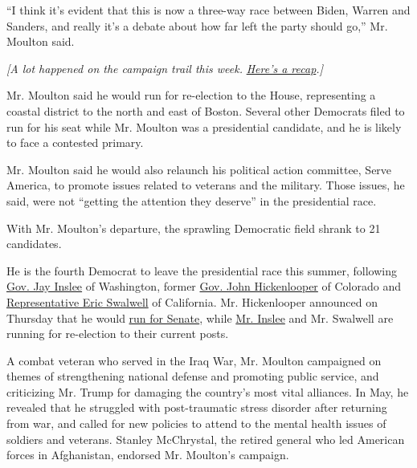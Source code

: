 ``I think it's evident that this is now a three-way race between Biden,
Warren and Sanders, and really it's a debate about how far left the
party should go,'' Mr. Moulton said.

\emph{{[}A lot happened on the campaign trail this week.}
\href{https://www.nytimes3xbfgragh.onion/2019/08/24/us/politics/2020-democratic-presidential-candidates.html}{\emph{Here's
a recap}}\emph{.{]}}

Mr. Moulton said he would run for re-election to the House, representing
a coastal district to the north and east of Boston. Several other
Democrats filed to run for his seat while Mr. Moulton was a presidential
candidate, and he is likely to face a contested primary.

Mr. Moulton said he would also relaunch his political action committee,
Serve America, to promote issues related to veterans and the military.
Those issues, he said, were not ``getting the attention they deserve''
in the presidential race.

With Mr. Moulton's departure, the sprawling Democratic field shrank to
21 candidates.

He is the fourth Democrat to leave the presidential race this summer,
following
\href{https://www.nytimes3xbfgragh.onion/2019/08/21/us/politics/jay-inslee-2020-campaign.html}{Gov.
Jay Inslee} of Washington, former
\href{https://www.nytimes3xbfgragh.onion/2019/08/15/us/politics/john-hickenlooper-drop-out-senate.html}{Gov.
John Hickenlooper} of Colorado and
\href{https://www.nytimes3xbfgragh.onion/2019/07/08/us/politics/steyer-swalwell-2020.html}{Representative
Eric Swalwell} of California. Mr. Hickenlooper announced on Thursday
that he would
\href{https://www.nytimes3xbfgragh.onion/2019/08/22/us/politics/john-hickenlooper-senate-2020.html}{run
for Senate}, while
\href{https://www.nytimes3xbfgragh.onion/2019/08/23/us/politics/jay-inslee.html}{Mr.
Inslee} and Mr. Swalwell are running for re-election to their current
posts.

A combat veteran who served in the Iraq War, Mr. Moulton campaigned on
themes of strengthening national defense and promoting public service,
and criticizing Mr. Trump for damaging the country's most vital
alliances. In May, he revealed that he struggled with post-traumatic
stress disorder after returning from war, and called for new policies to
attend to the mental health issues of soldiers and veterans. Stanley
McChrystal, the retired general who led American forces in Afghanistan,
endorsed Mr. Moulton's campaign.

